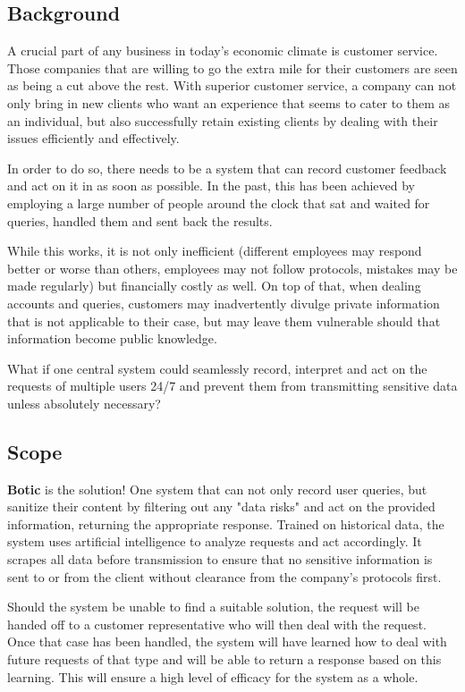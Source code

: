 \documentclass[11pt]{article}
\begin{document}
\subsection{Background}
A crucial part of any business in today's economic climate is customer service. Those companies that are willing to go the extra mile for their customers are seen as being a cut above the rest. With superior customer service, a company can not only bring in new clients who want an experience that seems to cater to them as an individual, but also successfully retain existing clients by dealing with their issues efficiently and effectively.\par
In order to do so, there needs to be a system that can record customer feedback and act on it in as soon as possible. In the past, this has been achieved by employing a large number of people around the clock that sat and waited for queries, handled them and sent back the results.\par

While this works, it is not only inefficient (different employees may respond better or worse than others, employees may not follow protocols, mistakes may be made regularly) but financially costly as well. On top of that, when dealing accounts and queries, customers may inadvertently divulge private information that is not applicable to their case, but may leave them vulnerable should that information become public knowledge.\par

What if one central system could seamlessly record, interpret and act on the requests of multiple users 24/7 and prevent them from transmitting sensitive data unless absolutely necessary?\par

\subsection{Scope}
\textbf{Botic} is the solution! One system that can not only record user queries, but sanitize their content by filtering out any "data risks" and act on the provided information, returning the appropriate response. Trained on historical data, the system uses artificial intelligence to analyze requests and act accordingly. It scrapes all data before transmission to ensure that no sensitive information is sent to or from the client without clearance from the company's protocols first.\par

Should the system be unable to find a suitable solution, the request will be handed off to a customer representative who will then deal with the request. Once that case has been handled, the system will have learned how to deal with future requests of that type and will be able to return a response based on this learning. This will ensure a high level of efficacy for the system as a whole.\par
\end{document}
